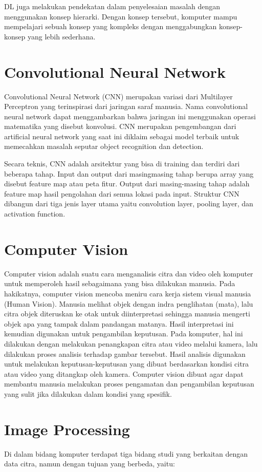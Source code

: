 DL juga melakukan pendekatan dalam penyelesaian masalah dengan menggunakan konsep hierarki.
Dengan konsep tersebut, komputer mampu mempelajari sebuah konsep yang kompleks dengan menggabungkan
konsep-konsep yang lebih sederhana.

\section{Convolutional Neural Network}
Convolutional Neural Network (CNN) merupakan variasi dari Multilayer Perceptron yang terinspirasi dari jaringan saraf manusia\citep{CNN2017}.
Nama convolutional neural network dapat menggambarkan bahwa jaringan ini menggunakan operasi matematika yang disebut konvolusi.
CNN merupakan pengembangan dari artificial neural network yang saat ini diklaim sebagai model terbaik untuk memecahkan masalah
seputar object recognition dan detection.

Secara teknis, CNN adalah arsitektur yang bisa di training
dan terdiri dari beberapa tahap. Input dan output dari masingmasing tahap berupa array yang disebut feature map atau peta
fitur. Output dari masing-masing tahap adalah feature map hasil pengolahan dari semua lokasi pada input. Struktur CNN dibangun
dari tiga jenis layer utama yaitu convolution layer, pooling layer, dan activation function\citep{CNN2017}.

\section{Computer Vision}
Computer vision adalah suatu cara menganalisis citra dan video oleh komputer untuk memperoleh hasil sebagaimana yang bisa dilakukan manusia.
Pada hakikatnya, computer vision mencoba meniru cara kerja sistem visual manusia (Human Vision)\citep{IJAIR42}. Manusia melihat objek dengan indra penglihatan (mata),
lalu citra objek diteruskan ke otak untuk diinterpretasi sehingga manusia mengerti objek apa yang tampak dalam pandangan matanya.
Hasil interpretasi ini kemudian digunakan untuk pengambilan keputusan.
Pada komputer, hal ini dilakukan dengan melakukan penangkapan citra atau video melalui kamera, lalu dilakukan proses analisis terhadap gambar tersebut.
Hasil analisis digunakan untuk melakukan keputusan-keputusan yang dibuat berdasarkan kondisi
citra atau video yang ditangkap oleh kamera. Computer vision dibuat agar dapat membantu manusia melakukan proses pengamatan
dan pengambilan keputusan yang sulit jika dilakukan dalam kondisi
yang spesifik.

\section{Image Processing}
Di dalam bidang komputer terdapat tiga bidang studi yang
berkaitan dengan data citra, namun dengan tujuan yang berbeda\citep{Umam2016},
yaitu:

